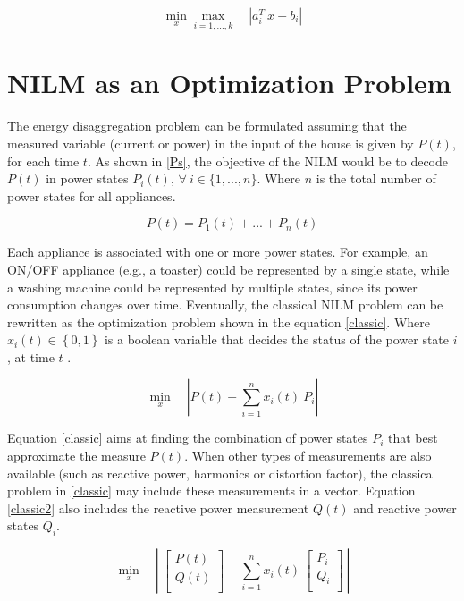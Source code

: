\begin{equation} \label{chebyshev}
    \min_{x} \max_{i=1,...,k} \quad \left| a_i^T\ x - b_i \right |
\end{equation}

\section{NILM as an Optimization Problem}

The energy disaggregation problem can be formulated assuming that the measured variable (current or power) in the input of the house is given by $P(t)$, for each time $t$. As shown in \eqref{Ps}, the objective of the NILM would be to decode $P(t)$ in power states $P_i(t)$, $\forall \ i \in \{1,...,n\}$. Where $n$ is the total number of power states for all appliances. 

\begin{equation} \label{Ps}
    P(t) = P_1(t) + ... + P_n(t)
\end{equation}
 
Each appliance is associated with one or more power states. For example, an ON/OFF appliance (e.g., a toaster) could be represented by a single state, while a washing machine could be represented by multiple states, since its power consumption changes over time. 
Eventually, the classical NILM problem can be rewritten as the optimization problem shown in the equation \eqref{classic}. Where $x_i(t) \in \left\{ 0 , 1 \right\}$ is a boolean variable that decides the status of the power state $i$, at time $t$ \cite{hart}.

\begin{equation} \label{classic}
    \min_{x} \quad \left| P(t) - \sum_{i=1}^{n} x_i(t)\ P_i \right |
\end{equation}

Equation \eqref{classic} aims at finding the combination of power states $P_i$ that best approximate the measure $P(t)$. When other types of measurements are also available (such as reactive power, harmonics or distortion factor), the classical problem in \eqref{classic} may include these measurements in a vector. Equation \eqref{classic2} also includes the reactive power measurement $Q(t)$ and reactive power states $Q_i$. 

\begin{equation} \label{classic2}
    \min_{x} \quad \left|\ \begin{bmatrix}
         P(t) \\
         Q(t) \\
        \end{bmatrix} - \sum_{i=1}^{n} x_i(t)\ \begin{bmatrix}
         P_i \\
         Q_i \\
        \end{bmatrix} \ \right|
\end{equation}

